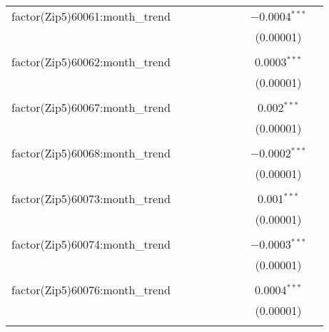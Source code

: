\begin{table}[H]
{\begin{tabular}{@{\extracolsep{5pt}}lcccccccc}
  factor(Zip5)60061:month\_trend &  &  &  &  &  &  & $-$0.0004$^{***}$ &  \\  

   &  &  &  &  &  &  & (0.00001) &  \\  

   & & & & & & & & \\  

  factor(Zip5)60062:month\_trend &  &  &  &  &  &  & 0.0003$^{***}$ &  \\  

   &  &  &  &  &  &  & (0.00001) &  \\  

   & & & & & & & & \\  

  factor(Zip5)60067:month\_trend &  &  &  &  &  &  & 0.002$^{***}$ &  \\  

   &  &  &  &  &  &  & (0.00001) &  \\  

   & & & & & & & & \\  

  factor(Zip5)60068:month\_trend &  &  &  &  &  &  & $-$0.0002$^{***}$ &  \\  

   &  &  &  &  &  &  & (0.00001) &  \\  

   & & & & & & & & \\  

  factor(Zip5)60073:month\_trend &  &  &  &  &  &  & 0.001$^{***}$ &  \\  

   &  &  &  &  &  &  & (0.00001) &  \\  

   & & & & & & & & \\  

  factor(Zip5)60074:month\_trend &  &  &  &  &  &  & $-$0.0003$^{***}$ &  \\  

   &  &  &  &  &  &  & (0.00001) &  \\  

   & & & & & & & & \\  

  factor(Zip5)60076:month\_trend &  &  &  &  &  &  & 0.0004$^{***}$ &  \\  

   &  &  &  &  &  &  & (0.00001) &  \\  

   & & & & & & & & \\  


\end{tabular}}
\end{table}
